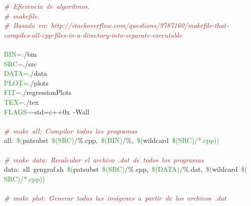 \noindent
\mbox{}\textit{\textcolor{Brown}{\#\ Eficiencia\ de\ algoritmos.}} \\
\mbox{}\textit{\textcolor{Brown}{\#\ makefile.}} \\
\mbox{}\textit{\textcolor{Brown}{\#\ Basado\ en:\ http://stackoverflow.com/questions/9787160/makefile-that-compiles-all-cpp-files-in-a-directory-into-separate-executable}} \\
\mbox{} \\
\mbox{}\textcolor{ForestGreen}{BIN=}\textcolor{BrickRed}{.}/bin \\
\mbox{}\textcolor{ForestGreen}{SRC=}\textcolor{BrickRed}{.}/src \\
\mbox{}\textcolor{ForestGreen}{DATA=}\textcolor{BrickRed}{.}/data \\
\mbox{}\textcolor{ForestGreen}{PLOT=}\textcolor{BrickRed}{.}/plots \\
\mbox{}\textcolor{ForestGreen}{FIT=}\textcolor{BrickRed}{.}/regressionPlots \\
\mbox{}\textcolor{ForestGreen}{TEX=}\textcolor{BrickRed}{.}/tex \\
\mbox{}\textcolor{ForestGreen}{FLAGS=}-std\textcolor{BrickRed}{=}c\textcolor{BrickRed}{++}0x\ -Wall \\
\mbox{} \\
\mbox{}\textit{\textcolor{Brown}{\#\ make\ all:\ Compilar\ todos\ los\ programas\ }} \\
\mbox{}\textcolor{BrickRed}{all:}\ \textcolor{ForestGreen}{\$(}patsubst\ \textcolor{ForestGreen}{\$(SRC)}\textcolor{BrickRed}{/\%}.cpp\textcolor{BrickRed}{,}\ \textcolor{ForestGreen}{\$(BIN)}\textcolor{BrickRed}{/\%,}\ \textcolor{ForestGreen}{\$(}wildcard\ \textcolor{ForestGreen}{\$(SRC)/*.cpp))} \\
\mbox{} \\
\mbox{}\textit{\textcolor{Brown}{\#\ make\ data:\ Recalcular\ el\ archivo\ .dat\ de\ todos\ los\ programas}} \\
\mbox{}\textcolor{BrickRed}{data:}\ all\ gengraf.sh\ \textcolor{ForestGreen}{\$(}patsubst\ \textcolor{ForestGreen}{\$(SRC)}\textcolor{BrickRed}{/\%}.cpp\textcolor{BrickRed}{,}\ \textcolor{ForestGreen}{\$(DATA)}\textcolor{BrickRed}{/\%}.dat\textcolor{BrickRed}{,}\ \textcolor{ForestGreen}{\$(}wildcard\ \textcolor{ForestGreen}{\$(SRC)/*.cpp))} \\
\mbox{} \\
\mbox{}\textit{\textcolor{Brown}{\#\ make\ plot:\ Generar\ todas\ las\ imágenes\ a\ partir\ de\ los\ archivos\ .dat}} \\
